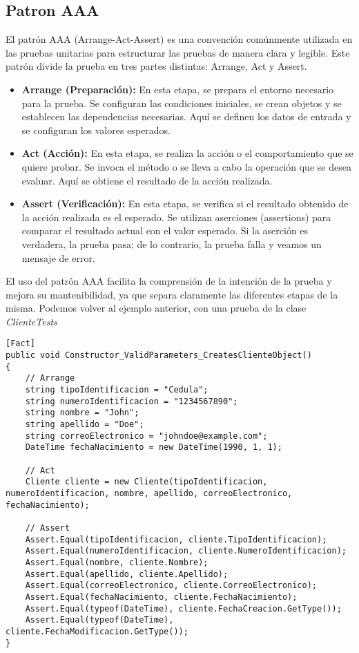 \documentclass[executivepaper]{article}
\begin{document}
\subsection{Patron AAA}
El patrón AAA (Arrange-Act-Assert) es una convención comúnmente utilizada en las pruebas unitarias para estructurar las pruebas de manera clara y legible. Este patrón divide la prueba en tres partes distintas: Arrange, Act y Assert.

\begin{itemize}
    \item \textbf{Arrange (Preparación):} En esta etapa, se prepara el entorno necesario para la prueba. Se configuran las condiciones iniciales, se crean objetos y se establecen las dependencias necesarias. Aquí se definen los datos de entrada y se configuran los valores esperados.
    \item \textbf{Act (Acción):} En esta etapa, se realiza la acción o el comportamiento que se quiere probar. Se invoca el método o se lleva a cabo la operación que se desea evaluar. Aquí se obtiene el resultado de la acción realizada.
    \item \textbf{Assert (Verificación):} En esta etapa, se verifica si el resultado obtenido de la acción realizada es el esperado. Se utilizan aserciones (assertions) para comparar el resultado actual con el valor esperado. Si la aserción es verdadera, la prueba pasa; de lo contrario, la prueba falla y veamos un mensaje de error.
\end{itemize}
El uso del patrón AAA facilita la comprensión de la intención de la prueba y mejora su mantenibilidad, ya que separa claramente las diferentes etapas de la misma. Podemos volver al ejemplo anterior, con una prueba de la clase \emph{ClienteTests}

\begin{lstlisting}
[Fact]
public void Constructor_ValidParameters_CreatesClienteObject()
{
    // Arrange
    string tipoIdentificacion = "Cedula";
    string numeroIdentificacion = "1234567890";
    string nombre = "John";
    string apellido = "Doe";
    string correoElectronico = "johndoe@example.com";
    DateTime fechaNacimiento = new DateTime(1990, 1, 1);

    // Act
    Cliente cliente = new Cliente(tipoIdentificacion, numeroIdentificacion, nombre, apellido, correoElectronico, fechaNacimiento);

    // Assert
    Assert.Equal(tipoIdentificacion, cliente.TipoIdentificacion);
    Assert.Equal(numeroIdentificacion, cliente.NumeroIdentificacion);
    Assert.Equal(nombre, cliente.Nombre);
    Assert.Equal(apellido, cliente.Apellido);
    Assert.Equal(correoElectronico, cliente.CorreoElectronico);
    Assert.Equal(fechaNacimiento, cliente.FechaNacimiento);
    Assert.Equal(typeof(DateTime), cliente.FechaCreacion.GetType());
    Assert.Equal(typeof(DateTime), cliente.FechaModificacion.GetType());
}
\end{lstlisting}
\end{document}
